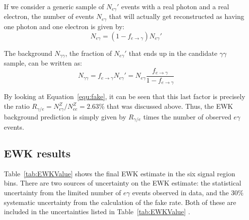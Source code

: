 If we consider a generic sample of $N_{e\gamma}'$ events with a real photon and a real electron, 
the number of events $N_{e\gamma}$ that will actually get reconstructed as having one photon and one electron is given by:
\begin{equation}
N_{e\gamma}=(1-f_{e\rightarrow\gamma})N_{e\gamma}'
\end{equation}

The background $N_{\gamma\gamma}$, the fraction of $N_{e\gamma}'$ that ends up in the candidate
$\gamma\gamma$ sample, can be written as:
\begin{equation}
N_{\gamma\gamma} = f_{e\rightarrow\gamma} N_{e\gamma}' = N_{e\gamma}\frac{f_{e\rightarrow\gamma}}{1-f_{e\rightarrow\gamma}}
\end{equation}

By looking at Equation~\ref{equ:fake}, it can be seen that this last factor is precisely the ratio $R_{\gamma/e} = N_{e\gamma}^Z/N_{ee}^Z = 2.63\%$ that was discussed above. Thus, the EWK background prediction is simply given by $R_{\gamma/e}$ times the number of observed $e\gamma$ events. 


\subsection{EWK results}
\label{sec:EWKresults}

Table~\ref{tab:EWKValue} shows the final EWK estimate in the six signal region bins. There are two sources of uncertainty on the EWK estimate: the statistical uncertainty from the limited number of $e\gamma$ events observed in data, and the 30\% systematic uncertainty from the calculation of the fake rate. Both of these are included in the uncertainties listed in Table~\ref{tab:EWKValue} .

